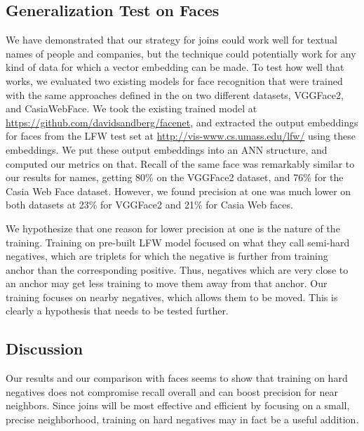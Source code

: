 \subsection{Generalization Test on Faces}

 We have demonstrated that our strategy for joins could work well for textual names of people and companies, but the technique could potentially work for any kind of data for which a vector embedding can be made.  To test how well that works, we evaluated two existing models for face recognition that were trained with the same approaches defined in the \cite{DBLP:conf/cvpr/SchroffKP15} on two different datasets, VGGFace2, and CasiaWebFace.  We took the existing trained model at \url{https://github.com/davidsandberg/facenet}, and extracted the output embeddings for faces from the LFW test set at \url{http://vis-www.cs.umass.edu/lfw/} using these embeddings.  We put these output embeddings into an ANN structure, and computed our metrics on that.  Recall of the same face was remarkably similar to our results for names, getting 80\% on the VGGFace2 dataset, and 76\% for the Casia Web Face dataset.  However, we found precision at one was much lower on both datasets at 23\% for VGGFace2 and 21\% for Casia Web faces.

We hypothesize that one reason for lower precision at one is the nature of the training.  Training on pre-built LFW model focused on what they call semi-hard negatives, which are triplets for which the negative is further from training anchor than the corresponding positive.  Thus, negatives which are very close to an anchor may get less training to move them away from that anchor.  Our training focuses on nearby negatives, which allows them to be moved.  This is clearly a hypothesis that needs to be tested further.

\subsection{Discussion}

 Our results and our comparison with faces seems to show that training on hard negatives does not compromise recall overall and can boost precision for near neighbors.  Since joins will be most effective and efficient by focusing on a small, precise neighborhood, training on hard negatives may in fact be a useful addition.
